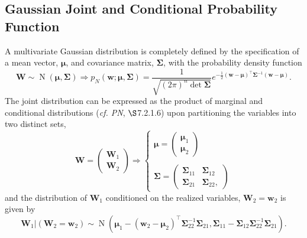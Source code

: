\documentclass[12pt, twoside, draft]{article}
\begin{document}
\subsection{Gaussian Joint and Conditional Probability Function}
A multivariate Gaussian distribution is completely defined by the specification of a mean vector, $\boldsymbol{\mu}$, and covariance matrix, $\boldsymbol{\Sigma}$, with the probability density function
\begin{equation}
\mathbf{W} \sim \operatorname{N}(\boldsymbol{\mu}, \boldsymbol{\Sigma}) \Rightarrow p_N(\mathbf{w}; \boldsymbol{\mu}, \boldsymbol{\Sigma}) = \frac{1}{\sqrt{(2\pi)^n \det \boldsymbol{\Sigma}}} e^{-\frac{1}{2}(\mathbf{w} - \boldsymbol{\mu})^\top \boldsymbol{\Sigma}^{-1} (\mathbf{w} - \boldsymbol{\mu})}.
\end{equation}
The joint distribution can be expressed as the product of marginal and conditional distributions (\textit{cf. PN}, $\S$7.2.1.6) upon partitioning the variables into two distinct sets,
\begin{equation}\label{eq:partitioned_Gaussian}
\mathbf{W} = \begin{pmatrix} \mathbf{W}_1 \\ \mathbf{W}_2 \end{pmatrix} \Rightarrow
\begin{cases}
\boldsymbol{\mu} = \begin{pmatrix} \boldsymbol{\mu}_1 \\ \boldsymbol{\mu}_2 \end{pmatrix} \\ \\
\boldsymbol{\Sigma} = \begin{pmatrix} \boldsymbol{\Sigma}_{11} & \boldsymbol{\Sigma}_{12} \\ \boldsymbol{\Sigma}_{21} & \boldsymbol{\Sigma}_{22}, \end{pmatrix}
\end{cases}
\end{equation}
and the distribution of $\mathbf{W}_1$ conditioned on the realized variables, $\mathbf{W}_2 = \mathbf{w}_2$ is given by
\begin{equation}\label{eq:conditioned_Gaussian}
\mathbf{W}_1 | (\mathbf{W}_2 = \mathbf{w}_2) \sim \operatorname{N}(\boldsymbol{\mu}_1 - (\mathbf{w}_2 - \boldsymbol{\mu}_2)^\top \boldsymbol{\Sigma}_{22}^{-1} \boldsymbol{\Sigma}_{21}, \boldsymbol{\Sigma}_{11} - \boldsymbol{\Sigma}_{12} \boldsymbol{\Sigma}_{22}^{-1} \boldsymbol{\Sigma}_{21}).
\end{equation}
\end{document}
